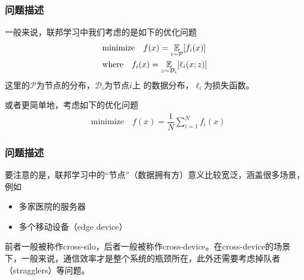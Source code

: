 \begin{frame}
\frametitle{问题描述}

一般来说，联邦学习中我们考虑的是如下的优化问题
\begin{align*}
    & \text{minimize} \quad f(x) = \operatorname*{\mathbb{E}}\limits_{i \sim {\mathcal{P}}} [f_i(x)] \\
    & \text{where} \quad f_i(x) = \operatorname*{\mathbb{E}}\limits_{z \sim \mathcal{D}_i} [\ell_i(x; z)]
\end{align*}
这里的$\mathcal{P}$为节点的分布，$\mathcal{D}_i$为节点$i$上 的数据分布，$\ell_i$为损失函数。

\pause
\vspace{1em}

或者更简单地，考虑如下的优化问题
\begin{align*}
    & \text{minimize} \quad f(x) = \dfrac{1}{N} \sum\limits_{i=1}^N f_i(x)
\end{align*}

\end{frame}


\begin{frame}
\frametitle{问题描述}

要注意的是，联邦学习中的``节点''（数据拥有方）意义比较宽泛，涵盖很多场景，例如
\begin{itemize}
    \item 多家医院的服务器
    \item 多个移动设备（edge device）
\end{itemize}

\pause
\vspace{1.5em}

前者一般被称作cross-silo，后者一般被称作cross-device。在cross-device的场景下，一般来说，通信效率才是整个系统的瓶颈所在，此外还需要考虑掉队者（stragglers）等问题。

\end{frame}


